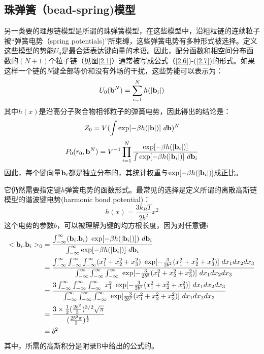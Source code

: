 \subsection{珠弹簧（bead-spring)模型}
\begin{center}
\author{何志娟}
\end{center}


另一类要的理想链模型是所谓的珠弹簧模型，在这些模型中，沿粗粒链的连续粒子被“弹簧电势（spring potentials)”所束缚，这些弹簧电势有多种形式被选择。定义这些模型的势能$U_{0}$是最合适表达键向量的术语。因此，配分函数和相空间分布函数的$(N+1)$个粒子链（见图\ref{2.1}）通常被写成公式（\ref{2.6})-(\ref{2.7})的形式。如果这样一个链的$N$键全部等价和没有外场的干扰，这些势能可以表示为：
\begin{equation}\label{2.26}
U_{0}(\mathbf{b}^{N})= \sum_{i=1}^{N}h(|\mathbf{b}_{i}|)
\end{equation}
其中$h(x)$是沿高分子聚合物相邻粒子的弹簧电势，因此得出的结论是：
\begin{equation}\label{2.27}
Z_{0}=V(\int \exp[-\beta h(|\mathbf{b}|)]~d\mathbf{b})^N 
\end{equation}
\begin{equation}\label{2.28}		
P_{0} (r_{0},\mathbf{b}^N) =V^{-1} \prod_{i=1}^{N} \frac{\exp[-\beta h(|\mathbf{b}_{i}|)]}{\int \exp[-\beta h(|\mathbf{b}_{i}|)]~d \mathbf{b}_{i}}
\end{equation}
因此，每个键向量$\mathbf{b}_{i}$都是独立分布的，其统计权重与$\exp[-\beta h(|\mathbf{b}_{i}|)]$成正比。 

它仍然需要指定键$h$弹簧电势的函数形式。最常见的选择是定义所谓的离散高斯链模型的谐波键电势(harmonic bond potential)： 
\begin{equation}\label{2.29}
h(x)=\frac{3k_{B}T}{2b^2} x^2  
\end{equation}
这个电势的参数$b$，可以被理解为键的均方根长度，因为对任意键$i$
\begin{equation}\label{2.30}
\begin{aligned}
<\mathbf{b}_{i}.\mathbf{b}_{i}>_{0}&= \frac{\int_{-\infty}^{\infty} (\mathbf{b}_{i}.\mathbf{b}_{i})~\exp[-\beta h(|\mathbf{b}_{i}|)])~d\mathbf{b}_{i}}{\int_{-\infty}^{\infty} \exp[-\beta h(|\mathbf{b}_{i}|)]~d\mathbf{b}_{i}}\\ &=\frac{\int_{-\infty}^{\infty}\int_{-\infty}^{\infty}\int_{-\infty}^{\infty}(x_1^2+x_2^2+x_3^2)~\exp[{-\frac{3}{2b^2}(x_1^2+x_2^2+x_3^2)}]~dx_1dx_2dx_3}{\int_{-\infty}^{\infty}\int_{-\infty}^{\infty}\int_{-\infty}^{\infty}~\exp[{-\frac{3}{2b^2}(x_1^2+x_2^2+x_3^2)}]~dx_1dx_2dx_3}\\ &=\frac{3\int_{-\infty}^{\infty}\int_{-\infty}^{\infty}\int_{-\infty}^{\infty}~x_1^2~\exp[{-\frac{3}{2b^2}(x_1^2+x_2^2+x_3^2)}]~dx_1dx_2dx_3}{\int_{-\infty}^{\infty}\int_{-\infty}^{\infty}\int_{-\infty}^{\infty}~\exp[{\frac{-3}{2b^2}(x_1^2+x_2^2+x_3^2)}]~dx_1dx_2dx_3}\\ &=\frac{3 \times\frac{1}{2} (\frac{2b^2}{3})^{3/2}\sqrt{\pi}}{(\frac{2b^2\pi}{3})^{\frac{1}{2}}}\\ &=b^2
\end{aligned}
\end{equation}
其中，所需的高斯积分是附录B中给出的公式的。


